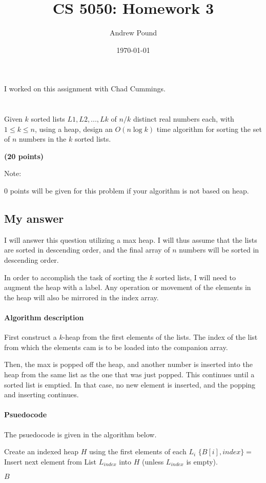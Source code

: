 \documentclass{article}
\title{CS 5050: Homework 3}
\author{Andrew Pound}
\date{\today}
\begin{document}
\maketitle

I worked on this assignment with Chad Cummings.
\section{}
Given $k$ sorted lists $L1, L2, . . . , Lk$ of $n/k$ distinct real
numbers each, with $1 \le k \le n$, using a heap, design an $O(n \log
k)$ time algorithm for sorting the set of $n$ numbers in the $k$
sorted  lists. {\bf (20 points)

Note:} 0 points will be given for this problem if your algorithm is
not based on heap. 


\subsection{My answer}
I will answer this question utilizing a max heap.  I will thus assume
that the lists are sorted in descending  order, and the final array of
$n$ numbers will be sorted in descending order. 
 
In order to accomplish the task of sorting the $k$ sorted lists, I
will need to augment the heap with a label.  Any operation or movement 
of the elements in the heap will also be mirrored in the index array. 

\paragraph{Algorithm description}First construct a $k$-heap from the
first elements of the  
lists. The index of the list from which the elements cam is to be
loaded into the companion array.  

Then, the max is popped off the heap, and another number is inserted
into the heap from the same list as the one that was just popped.
This continues until a sorted list is emptied.  In that case, no new
element is inserted, and the popping and inserting continues.

\paragraph{Psuedocode} The psuedocode is given in the algorithm
below. 


{\singlespacing
\begin{algorithmic}
  \State Create an indexed heap $H$ using the first elements of each $L_i$
    \State $\{B[i], index\} = $ 
    \State Insert next element from List $L_{index}$ into $H$ (unless
    $L_{index}$ is empty).
  \EndFor
  
   $B$
\EndFunction
\end{algorithmic}
}
\end{document}
